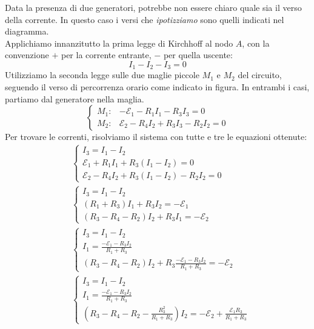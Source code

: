 \begin{solution}
	Data la presenza di due generatori, potrebbe non essere chiaro quale sia il verso della corrente. In questo caso i versi che \textit{ipotizziamo} sono quelli indicati nel diagramma.\\
	Applichiamo innanzitutto la prima legge di Kirchhoff al nodo $A$, con la convenzione $+$ per la corrente entrante, $-$ per quella uscente:
	\begin{equation*}
		I_1-I_2-I_3=0
	\end{equation*}
	Utilizziamo la seconda legge sulle due maglie piccole $M_1$ e $M_2$ del circuito, seguendo il verso di percorrenza orario come indicato in figura. In entrambi i casi, partiamo dal generatore nella maglia.
	\begin{equation*}
		\begin{cases}
			M_1\colon & -\mathcal{E}_1-R_1I_1-R_3I_3=0\\
			M_2\colon & \mathcal{E}_2-R_4I_2+R_3I_3-R_2I_2=0
		\end{cases}
	\end{equation*}
	Per trovare le correnti, risolviamo il sistema con tutte e tre le equazioni ottenute:
	\begin{align*}
		&\begin{cases}
			I_3=I_1-I_2\\
			\mathcal{E}_1+R_1I_1+R_3\left(I_1-I_2\right)=0\\
			\mathcal{E}_2-R_4I_2+R_3\left(I_1-I_2\right)-R_2I_2=0
		\end{cases}\\
	&\begin{cases}
		I_3=I_1-I_2\\
		\left(R_1+R_3\right)I_1+R_3I_2=-\mathcal{E}_1\\
		\left(R_3-R_4-R_2\right)I_2+R_3I_1=-\mathcal{E}_2
	\end{cases}\\
	&\begin{cases}
	I_3=I_1-I_2\\
	I_1=\frac{-\mathcal{E}_1-R_3I_2}{R_1+R_3}\\
	\left(R_3-R_4-R_2\right)I_2+R_3\frac{-\mathcal{E}_1-R_3I_2}{R_1+R_3}=-\mathcal{E}_2
	\end{cases}\\
	&\begin{cases}
		I_3=I_1-I_2\\
		I_1=\frac{-\mathcal{E}_1-R_3I_2}{R_1+R_3}\\
		\left(R_3-R_4-R_2-\frac{R_3^2}{R_1+R_3}\right)I_2=-\mathcal{E}_2+\frac{\mathcal{E}_1R_3}{R_1+R_3}

\end{cases}
\end{align*}
\end{solution}
